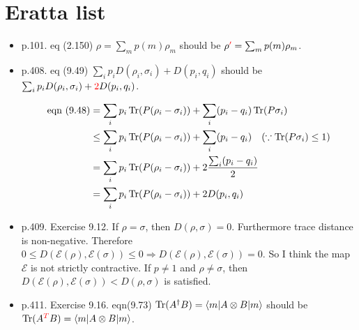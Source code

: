 \section{Eratta list}\label{errata}

\begin{itemize}
    \item p.101. eq (2.150) $\rho = \sum_m p(m) \rho_m$ should be $\rho \textcolor{red}{'} = \sum_m p(m) \rho_m$.
%    
    \item p.408. eq (9.49) $\sum_i p_i D(\rho_i, \sigma_i) + D(p_i, q_i)$ should be $\sum_i p_i D(\rho_i, \sigma_i) + \textcolor[rgb]{1,0,0}{2}D(p_i, q_i)$.
    
    \begin{align*}
    \text{eqn } (9.48) &= \sum_i p_i \operatorname{Tr} (P(\rho_i - \sigma_i)) + \sum_i (p_i - q_i) \operatorname{Tr} (P \sigma_i)\\
    &\leq \sum_i p_i \operatorname{Tr} (P(\rho_i - \sigma_i)) + \sum_i (p_i - q_i)~~~(\because \operatorname{Tr} (P \sigma_i) \leq 1)\\
    &= \sum_i p_i \operatorname{Tr} (P(\rho_i - \sigma_i)) + 2 \frac{\sum_i (p_i - q_i)}{2}\\
    &= \sum_i p_i \operatorname{Tr} (P(\rho_i - \sigma_i)) + 2D(p_i, q_i)
    \end{align*}
%    
    \item p.409. Exercise 9.12. If $\rho = \sigma$, then $D(\rho, \sigma) = 0$. Furthermore trace distance is non-negative. Therefore $0 \leq D(\mathcal{E}(\rho), \mathcal{E}(\sigma)) \leq 0 \Rightarrow D(\mathcal{E}(\rho), \mathcal{E}(\sigma))  = 0$. So I think the map $\mathcal{E}$ is not strictly contractive. If $p \neq 1$ and $\rho \neq \sigma$, then $D(\mathcal{E}(\rho), \mathcal{E}(\sigma)) < D(\rho, \sigma)$ is satisfied.
%    
    \item p.411. Exercise 9.16. eqn(9.73) $\operatorname{Tr} (A^\dagger B) = \braket{m | A \otimes B | m}$ should be $\operatorname{Tr} (A^{\textcolor{red}{T}} B) = \braket{m | A \otimes B | m}$.
    

\end{itemize}
